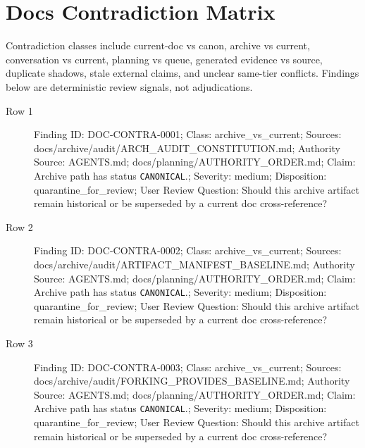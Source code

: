 \documentclass[10.5pt,a4paper,openany]{book}
\begin{document}
\section{Docs Contradiction Matrix}

Contradiction classes include current-\allowbreak{}doc vs canon, archive vs current, conversation vs current, planning vs queue, generated evidence vs source, duplicate shadows, stale external claims, and unclear same-\allowbreak{}tier conflicts.\allowbreak{} Findings below are deterministic review signals, not adjudications.\allowbreak{}


\begin{description}
\item[Row 1] Finding ID: DOC-\allowbreak{}CONTRA-\allowbreak{}0001; Class: archive\_\allowbreak{}vs\_\allowbreak{}current; Sources: docs/\allowbreak{}archive/\allowbreak{}audit/\allowbreak{}ARCH\_\allowbreak{}AUDIT\_\allowbreak{}CONSTITUTION.\allowbreak{}md; Authority Source: AGENTS.\allowbreak{}md; docs/\allowbreak{}planning/\allowbreak{}AUTHORITY\_\allowbreak{}ORDER.\allowbreak{}md; Claim: Archive path has status \texttt{CANONICAL}.\allowbreak{}; Severity: medium; Disposition: quarantine\_\allowbreak{}for\_\allowbreak{}review; User Review Question: Should this archive artifact remain historical or be superseded by a current doc cross-\allowbreak{}reference?
\item[Row 2] Finding ID: DOC-\allowbreak{}CONTRA-\allowbreak{}0002; Class: archive\_\allowbreak{}vs\_\allowbreak{}current; Sources: docs/\allowbreak{}archive/\allowbreak{}audit/\allowbreak{}ARTIFACT\_\allowbreak{}MANIFEST\_\allowbreak{}BASELINE.\allowbreak{}md; Authority Source: AGENTS.\allowbreak{}md; docs/\allowbreak{}planning/\allowbreak{}AUTHORITY\_\allowbreak{}ORDER.\allowbreak{}md; Claim: Archive path has status \texttt{CANONICAL}.\allowbreak{}; Severity: medium; Disposition: quarantine\_\allowbreak{}for\_\allowbreak{}review; User Review Question: Should this archive artifact remain historical or be superseded by a current doc cross-\allowbreak{}reference?
\item[Row 3] Finding ID: DOC-\allowbreak{}CONTRA-\allowbreak{}0003; Class: archive\_\allowbreak{}vs\_\allowbreak{}current; Sources: docs/\allowbreak{}archive/\allowbreak{}audit/\allowbreak{}FORKING\_\allowbreak{}PROVIDES\_\allowbreak{}BASELINE.\allowbreak{}md; Authority Source: AGENTS.\allowbreak{}md; docs/\allowbreak{}planning/\allowbreak{}AUTHORITY\_\allowbreak{}ORDER.\allowbreak{}md; Claim: Archive path has status \texttt{CANONICAL}.\allowbreak{}; Severity: medium; Disposition: quarantine\_\allowbreak{}for\_\allowbreak{}review; User Review Question: Should this archive artifact remain historical or be superseded by a current doc cross-\allowbreak{}reference?

\end{description}
\end{document}
